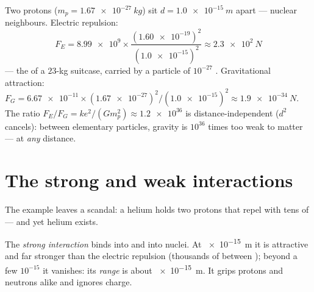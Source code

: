 \begin{example}\label{ex:g11:fundamental-interactions:protons}
Two protons ($m_p = \qty{1.67e-27}{kg}$) sit $d = \qty{1.0e-15}{m}$
apart --- nuclear neighbours. Electric repulsion:
\[
F_E = \num{8.99e9} \times
\frac{(\num{1.60e-19})^{2}}{(\num{1.0e-15})^{2}}
\approx \qty{2.3e2}{N}
\]
--- the  of a $23$-kg suitcase, carried by a particle of
$10^{-27}$ . Gravitational attraction:
$F_G = \num{6.67e-11} \times (\num{1.67e-27})^{2} /
(\num{1.0e-15})^{2} \approx \qty{1.9e-34}{N}$. The ratio
$F_E / F_G = k e^{2} / (G m_p^{2}) \approx \num{1.2e36}$ is
distance-independent ($d^{2}$ cancels): between elementary particles,
gravity is $10^{36}$ times too weak to matter --- at \emph{any} distance.
\end{example}

\section{The strong and weak interactions}

The example leaves a scandal: a helium  holds two protons that
repel with tens of  --- and yet helium exists.

\begin{definition}\label{def:g11:fundamental-interactions:strong}
The \emph{strong interaction} binds 
into  and  into nuclei. At \qty{e-15}{m} it is
attractive and far stronger than the electric repulsion (thousands of
 between ); beyond a few $10^{-15}$  it vanishes:
its \emph{range} is about
\qty{e-15}{m}. It grips protons and neutrons alike and ignores charge.
\end{definition}


